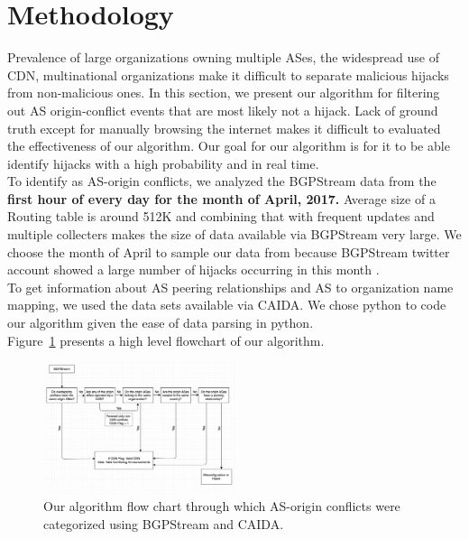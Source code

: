  \section{Methodology}\label{sec:methodology}
Prevalence of large organizations owning multiple ASes, the widespread use of CDN, multinational organizations make it difficult to separate malicious hijacks from non-malicious ones. In this section, we present our algorithm for filtering out AS origin-conflict events that are most likely not a hijack. Lack of ground truth except for manually browsing the internet makes it difficult to evaluated the effectiveness of our algorithm. Our goal for our algorithm is for it to be able identify hijacks with a high probability and in real time.\\
To identify as AS-origin conflicts, we analyzed the BGPStream data from the\textbf{ first hour of every day for the month of April, 2017.} Average size of a Routing table is around 512K and combining that with frequent updates and multiple collecters makes the size of data available via BGPStream very large\cite{noauthor_bgp_nodate}. We choose the month of April to sample our data from because BGPStream twitter account showed  a large number of hijacks occurring in this month \cite{}.\\To get information about AS peering relationships and AS to organization name mapping, we used the data sets available via CAIDA\cite{mapping}. We chose python to code our algorithm given the ease of data parsing in python.\\ 
Figure~\ref{fig:flowchart} presents a high level flowchart of our algorithm.
 \begin{figure}[!htbp]
	\includegraphics[width=0.5\textwidth]{flow.png}
	\caption{Our algorithm flow chart through which AS-origin conflicts were categorized using BGPStream and CAIDA.}
	\label{fig:flowchart}
\end{figure}

